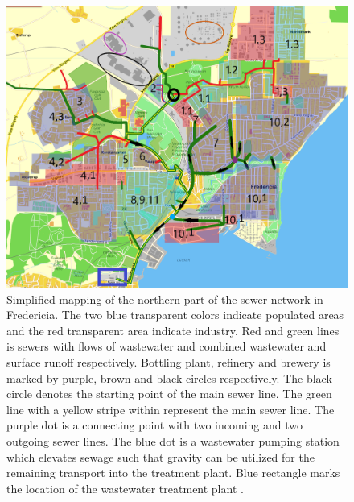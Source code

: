 \begin{figure}[H]
\centering
\includegraphics[width=1\textwidth]{report/system_overview/pictures/kloakgrid_simplified9_temp.png}
\caption{Simplified mapping of the northern part of the sewer network in Fredericia. The two blue transparent colors indicate populated areas and the red transparent area indicate industry. Red and green lines is sewers with flows of wastewater and combined wastewater and surface runoff respectively. Bottling plant, refinery and brewery is marked by purple, brown and black circles respectively. The black circle denotes the starting point of the main sewer line. The green line with a yellow stripe within represent the main sewer line. The purple dot is a connecting point with two incoming and two outgoing sewer lines. The blue dot is a wastewater pumping station which elevates sewage such that gravity can be utilized for the remaining transport into the treatment plant. Blue rectangle marks the location of the wastewater treatment plant .
\cite{Krak} \cite{GIS_kort}}
\label{fig:kloakgrid_simplified}
\end{figure}

